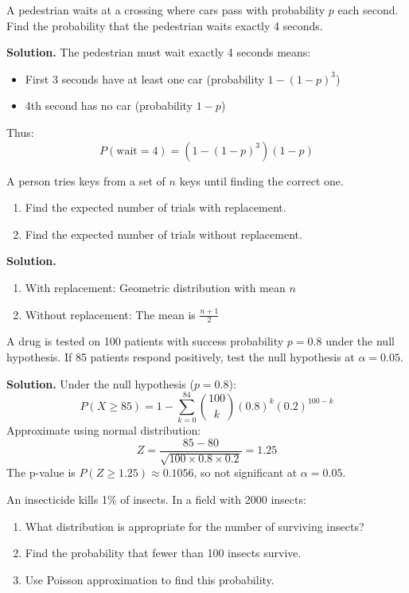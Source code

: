 \begin{problembox}
A pedestrian waits at a crossing where cars pass with probability \( p \) each second. Find the probability that the pedestrian waits exactly 4 seconds.
\end{problembox}

\noindent\textbf{Solution.}
The pedestrian must wait exactly 4 seconds means:
\begin{itemize}
\item First 3 seconds have at least one car (probability \( 1 - (1-p)^3 \))
\item 4th second has no car (probability \( 1-p \))
\end{itemize}
Thus:
\[ P(\text{wait}=4) = (1 - (1-p)^3)(1-p) \]

\begin{problembox}
A person tries keys from a set of \( n \) keys until finding the correct one.
\begin{enumerate}[label=(\alph*)]
\item Find the expected number of trials with replacement.
\item Find the expected number of trials without replacement.
\end{enumerate}
\end{problembox}

\noindent\textbf{Solution.}
\begin{enumerate}[label=(\alph*)]
\item With replacement: Geometric distribution with mean \( n \)
\item Without replacement: The mean is \( \frac{n+1}{2} \)
\end{enumerate}

\begin{problembox}
A drug is tested on 100 patients with success probability \( p = 0.8 \) under the null hypothesis. If 85 patients respond positively, test the null hypothesis at \( \alpha = 0.05 \).
\end{problembox}

\noindent\textbf{Solution.}
Under the null hypothesis (\( p = 0.8 \)):
\[ P(X \geq 85) = 1 - \sum_{k=0}^{84} \binom{100}{k} (0.8)^k (0.2)^{100-k} \]
Approximate using normal distribution:
\[ Z = \frac{85 - 80}{\sqrt{100 \times 0.8 \times 0.2}} = 1.25 \]
The p-value is \( P(Z \geq 1.25) \approx 0.1056 \), so not significant at \( \alpha = 0.05 \).

\begin{problembox}
An insecticide kills 1\% of insects. In a field with 2000 insects:
\begin{enumerate}[label=(\alph*)]
\item What distribution is appropriate for the number of surviving insects?
\item Find the probability that fewer than 100 insects survive.
\item Use Poisson approximation to find this probability.
\end{enumerate}
\end{problembox}

